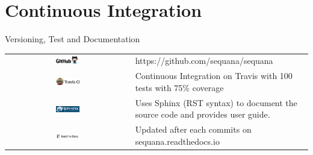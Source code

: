 \documentclass{beamer}
\begin{document}
\section{Continuous Integration}

\begin{frame}{Versioning, Test and Documentation}
\begin{tabular}{cp{8cm}}
\vspace{0.5cm}
\includegraphics[width=0.2\textwidth,height=0.1\textheight]{../../images/logo_github.png}
& https://github.com/sequana/sequana\\

\vspace{0.5cm}
\includegraphics[width=0.2\textwidth]{../../images/logo_travis.png}&  
Continuous Integration on Travis with 100 tests with 75\% coverage\\

\vspace{0.5cm}
\includegraphics[width=0.2\textwidth]{../../images/logo_sphinx.png}& 
Uses Sphinx (RST syntax) to document the source 
code and provides user guide.\\

\vspace{0.5cm}
\includegraphics[width=0.2\textwidth]{../../images/logo_rtd.png}& 
Updated after each commits on sequana.readthedocs.io
\end{tabular}

\end{frame}
\end{document}
